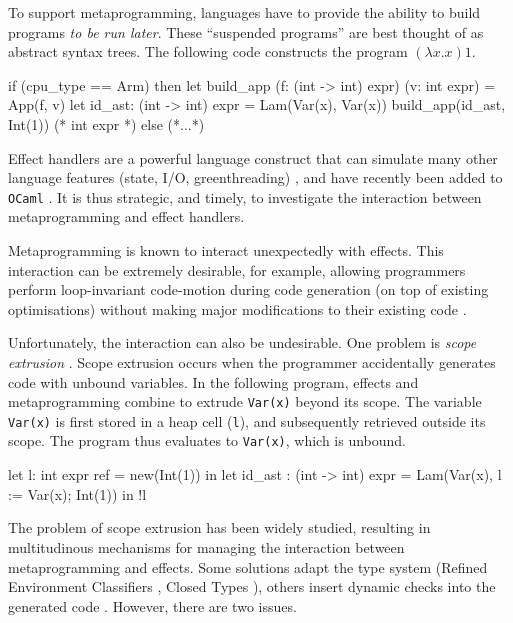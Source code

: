 To support metaprogramming, languages have to provide the ability to build programs \textit{to be run later}. These ``suspended programs'' are best thought of as abstract syntax trees. The following code constructs the program $(\lambda x. x) 1$.
\begin{ocaml}
if (cpu_type == Arm) then 
  let build_app (f: (int -> int) expr) (v: int expr) = App(f, v)
  let id_ast: (int -> int) expr = Lam(Var(x), Var(x))
  build_app(id_ast, Int(1)) (* int expr *)
else 
  (*...*)
\end{ocaml}

Effect handlers are a powerful language construct that can simulate many other language features (state, I/O, greenthreading) \citep{pretnar-15}, and have recently been added to \texttt{OCaml} \citep{sivaramakrishnan-21}.  It is thus strategic, and timely, to investigate the interaction between metaprogramming and effect handlers. 

Metaprogramming is known to interact unexpectedly with effects. This interaction can be extremely desirable, for example, allowing programmers perform loop-invariant code-motion during code generation (on top of existing optimisations) \citep{kiselyov-14} without making major modifications to their existing code \citep{lawall-94}. 

Unfortunately, the interaction can also be undesirable. One problem is \textit{scope extrusion} \citep{kiselyov-14}. Scope extrusion occurs when the programmer accidentally generates code with unbound variables. In the following program, effects and metaprogramming combine to extrude \texttt{Var(x)} beyond its scope. The variable \texttt{Var(x)} is first stored in a heap cell (\texttt{l}), and subsequently retrieved outside its scope. The program thus evaluates to \texttt{Var(x)}, which is unbound.

\begin{ocaml}
let l: int expr ref = new(Int(1)) in 
let id_ast : (int -> int) expr = Lam(Var(x), l := Var(x); Int(1)) in
!l
\end{ocaml} 

The problem of scope extrusion has been widely studied, resulting in multitudinous mechanisms for managing the interaction between metaprogramming and effects. Some solutions adapt the type system (Refined Environment Classifiers \citep{kiselyov-16,isoda-24}, Closed Types \citep{calcagno-00}), others insert dynamic checks into the generated code \citep{kiselyov-14}. However, there are two issues.

